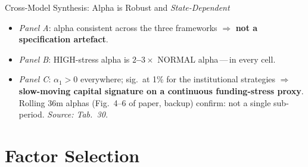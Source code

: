 \documentclass[aspectratio=169,11pt]{beamer}
\newcommand{\hlt}[1]{\textcolor{edhecred}{\textbf{#1}}}     %
\newcommand{\hltb}[1]{\textcolor{accentblue}{\textbf{#1}}}  %
\begin{document}
\begin{frame}[t]{Cross-Model Synthesis: Alpha is Robust and \emph{State-Dependent}}
\vspace{0.30cm}

\begin{itemize}\itemsep=0.05cm\footnotesize
  \item \emph{Panel A}: alpha consistent across the three frameworks $\Rightarrow$ \hltb{not a specification artefact}.
  \item \emph{Panel B}: HIGH-stress alpha is \hlt{$2$--$3\times$} NORMAL alpha\,---\,in every cell.
  \item \emph{Panel C}: $\alpha_1 > 0$ everywhere; sig.\ at 1\% for the institutional strategies $\Rightarrow$ \hltb{slow-moving capital signature on a continuous funding-stress proxy}. Rolling 36m alphas (Fig.\ 4--6 of paper, backup) confirm: not a single sub-period. \emph{Source: Tab.\ 30.}
\end{itemize}

\end{frame}


\section{Factor Selection}
\end{document}
